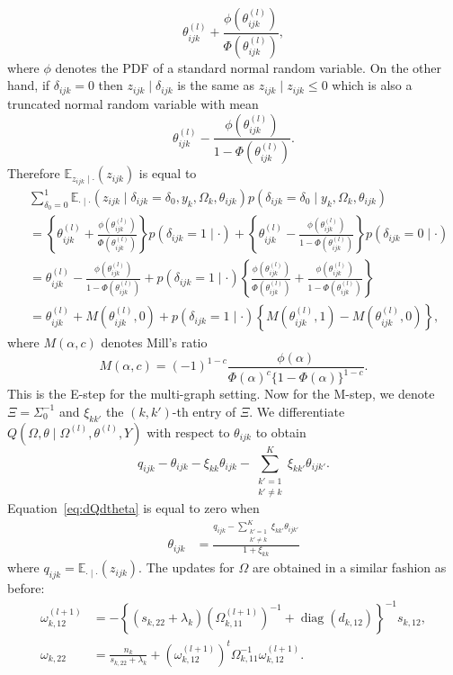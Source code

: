 \documentclass[a4paper, 11pt, oneside]{report}
\DeclareMathOperator{\diag}{diag}
\newcommand{\E}{\mathbb{E}}
\newcommand{\1}{\mathds{1}}
\newcommand{\powl}{^{(l)}}
\newcommand{\inv}{^{-1}}
\newcommand{\tijkl}{\theta_{ijk}\powl}
\begin{document}
\[\theta_{ijk}\powl + \frac{\phi(\theta_{ijk}\powl)}{\Phi(\theta_{ijk}\powl)},\]
where $\phi$ denotes the PDF of a standard normal random variable.
On the other hand, if $\delta_{ijk} = 0$ then $z_{ijk} \mid \delta_{ijk}$ is the
same as $z_{ijk} \mid z_{ijk} \leq 0$ which is also a truncated normal random
variable with mean
\[
	\theta_{ijk}\powl - \frac{\phi(\theta_{ijk}\powl)}{1 - \Phi(\theta_{ijk}\powl)}.
\]
Therefore $\E_{z_{ijk} \mid \cdot}(z_{ijk})$ is equal to
\begin{align*}
	 & \sum_{\delta_0 = 0}^1 \E_{\cdot \mid
   \cdot}\left(z_{ijk} \mid \delta_{ijk} = \delta_0, y_k, \Omega_k, \theta_{ijk}\right)
   p(\delta_{ijk} = \delta_0 \mid y_k, \Omega_k, \theta_{ijk})                               \\
	 & = \left\{\tijkl +
	\frac{\phi(\tijkl)}{\Phi(\tijkl)}\right\}
	p(\delta_{ijk} = 1 \mid \cdot) + \left\{\theta_{ijk}\powl -
	\frac{\phi(\theta_{ijk}\powl)}{1 -
	\Phi(\theta_{ijk}\powl)}\right\}p(\delta_{ijk} = 0 \mid \cdot) \label{eq:expect-z} \\
	 & = \tijkl - \frac{\phi(\tijkl)}{1 - \Phi(\tijkl)} + p(\delta_{ijk} = 1
	\mid \cdot) \left\{\frac{\phi(\tijkl)}{\Phi(\tijkl)} + \frac{\phi(\tijkl)}{1
	- \Phi(\tijkl)}\right\}                                                        \\
	 & = \tijkl + M\left(\tijkl, 0\right) + p(\delta_{ijk} = 1 \mid
	\cdot)\left\{M\left(\tijkl, 1\right) -
	M\left(\tijkl, 0\right)\right\},
\end{align*}
where $M(\alpha, c)$ denotes Mill's ratio
\[
  M(\alpha, c) = (-1)^{1-c}\frac{\phi(\alpha)}{\Phi(\alpha)^c \{1 - \Phi(\alpha)\}^{1-c}}.
\]
This is the E-step for the multi-graph setting.
Now for the M-step, we denote $\Xi = \Sigma_0\inv$ and $\xi_{kk'}$ the $(k, k')$-th entry of $\Xi$.
We differentiate $Q(\Omega, \theta \mid \Omega\powl, \theta\powl, Y)$ with respect to
$\theta_{ijk}$ to obtain
\begin{equation}\label{eq:dQdtheta}
	q_{ijk} - \theta_{ijk}  - \xi_{kk} \theta_{ijk} - \sum_{\substack
		{k' = 1 \\ k' \neq k}}^K \xi_{k k'} \theta_{ijk'}.
\end{equation}
Equation~\eqref{eq:dQdtheta} is equal to
zero when
\begin{align*}
	\theta_{ijk} & = \frac{q_{ijk} - \sum_{\substack{k'=1 \\ k' \neq k}}^K \xi_{k k'}\theta_{ijk'}}{ 1 + \xi_{kk}}
\end{align*}
where $q_{ijk} = \E_{\cdot \mid \cdot}(z_{ijk})$.
The updates for $\Omega$ are obtained in a similar fashion as before:
\begin{align*}
	\omega_{k,12}^{(l+1)} & = -\left\{(s_{k, 22} + \lambda_k) \left(\Omega_{k, 11}^{(l+1)}\right)\inv + \diag(d_{k, 12})\right\}\inv s_{k, 12},  \\
	\omega_{k, 22}        & = \frac{n_k}{s_{k,22} + \lambda_k} + \left(\omega_{k,12}^{(l+1)}\right)^t \Omega_{k, 11}\inv \omega_{k, 12}^{(l+1)}.
\end{align*}
\end{document}
